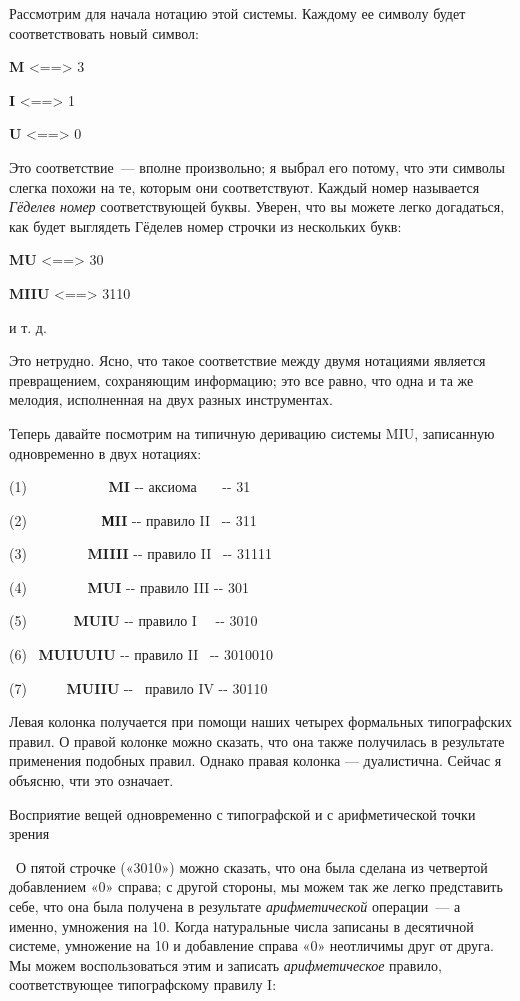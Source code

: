\documentclass[../main.tex]{subfiles}
\begin{document}
Рассмотрим для начала нотацию этой системы. Каждому ее символу будет соответствовать новый символ:

\textbf{M} \textless==\textgreater{} 3

\textbf{I} \textless==\textgreater{} 1

\textbf{U} \textless==\textgreater{} 0

Это соответствие~--- вполне произвольно; я выбрал его потому, что эти символы слегка похожи на те, которым они соответствуют. Каждый номер называется \emph{Гёделев номер} соответствующей буквы. Уверен, что вы можете легко догадаться, как будет выглядеть Гёделев номер строчки из нескольких букв:

\textbf{MU} \textless==\textgreater{} 30

\textbf{MIIU} \textless==\textgreater{} 3110

и т. д.

Это нетрудно. Ясно, что такое соответствие между двумя нотациями является превращением, сохраняющим информацию; это все равно, что одна и та же мелодия, исполненная на двух разных инструментах.

Теперь давайте посмотрим на типичную деривацию системы MIU, записанную одновременно в двух нотациях:

(1)~~~~~~~~~~~ \textbf{MI} -\/- аксиома~~~ -\/- 31

(2)~~~~~~~~~~ \textbf{МII} -\/- правило II~ -\/- 311

(3)~~~~~~~~ \textbf{MIIII} -\/- правило II~ -\/- 31111

(4)~~~~~~~~ \textbf{MUI} -\/- правило III -\/- 301

(5)~~~~~~ \textbf{MUIU} -\/- правило I~~ -\/- 3010

(6)~ \textbf{MUIUUIU} -\/- правило II~ -\/- 3010010

(7)~~~~~ \textbf{MUIIU} -\/-~ правило IV -\/- 30110

Левая колонка получается при помощи наших четырех формальных типографских правил. О правой колонке можно сказать, что она также получилась в результате применения подобных правил. Однако правая колонка --- дуалистична. Сейчас я объясню, чти это означает.

Восприятие вещей одновременно с типографской и с арифметической точки зрения

~О пятой строчке («3010») можно сказать, что она была сделана из четвертой добавлением «0» справа; с другой стороны, мы можем так же легко представить себе, что она была получена в результате \emph{арифметической} операции~--- а именно, умножения на 10. Когда натуральные числа записаны в десятичной системе, умножение на 10 и добавление справа «0» неотличимы друг от друга. Мы можем воспользоваться этим и записать \emph{арифметическое} правило, соответствующее типографскому правилу I:
\end{document}
